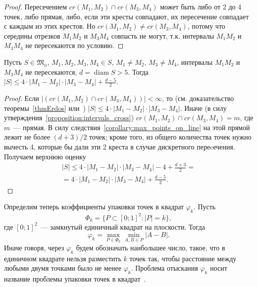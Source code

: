 \begin{proof}
	Пересечением $cr(M_1,M_2) \cap cr(M_3,M_4)$ может быть либо от 2 до 4 точек, либо прямая,
	либо, если эти кресты совпадают, их пересечение совпадает с каждым из этих крестов.
	Но $cr(M_1,M_2) \neq cr(M_3,M_4)$, потому что середины отрезков $M_1 M_2$ и $M_3 M_4$
	совпасть не могут, т.к. интервалы $M_1 M_2$ и $M_3 M_4$ не пересекаются по условию.
\end{proof}

\begin{lemma}
	\label{lemma_preliminary_size}
	Пусть $S\in\mathfrak{M}_n$,
	$M_1, M_2, M_3, M_4 \in S$,
	$M_1 \neq M_2$, $M_3 \neq M_4$,
	интервалы $M_1 M_2$ и $M_3 M_4$ не пересекаются,
	$d = \operatorname{diam} S > 5$.
	Тогда $|S| \leq 4 \cdot |M_1 - M_2| \cdot |M_3 - M_4| + \frac{d-5}{2}$.
\end{lemma}

\begin{proof}
	Если $|(cr(M_1, M_2) \cap cr(M_3, M_4))| < \infty$,
	то (см. доказательство теоремы~\ref{thmErdos} или~\cite[часть 2, неравенство (1)]{solymosi2003note})
	$|S| \leq 4 \cdot |M_1 - M_2| \cdot |M_3 - M_4|$.
	Иначе (в силу утверждения~\ref{proposition:intervals_cross}) $cr(M_1, M_2) \cap cr(M_3, M_4) = m$,
	где $m$~--- прямая.
	В силу следствия~\ref{corollary:max_points_on_line} на этой прямой лежит не более $(d+3)/2$ точек;
	кроме того, из общего количества точек нужно вычесть 4,
	которые бы дали эти 2 креста в случае дискретного переcечения.
	Получаем верхнюю оценку
	\begin{multline}
		|S| \leq 4 \cdot |M_1 - M_2| \cdot |M_3 - M_4| - 4 + \frac{d+3}{2}
		=
		\\=
		4 \cdot |M_1 - M_2| \cdot |M_3 - M_4| + \frac{d-5}{2}
		.
	\end{multline}
\end{proof}

Определим теперь коэффициенты упаковки точек в квадрат $\varphi_k$.
Пусть
\begin{equation*}
	\Phi_k = \{ P \subset [0;1]^2 : |P|=k\}
	,
\end{equation*}
где $[0;1]^2$~--- замкнутый единичный квадрат на плоскости.
Тогда
\begin{equation*}
	\varphi_k = \max_{P \in \Phi_k} \min_{A,B \in P} |A - B|
	.
\end{equation*}
Иначе говоря, через $\varphi_k$ будем обозначать наибольшее число, такое,
что в единичном квадрате нельзя разместить $k$ точек так,
чтобы расстояние между любыми двумя точками было не менее $\varphi_k$.
Проблема отыскания $\varphi_k$ носит название проблемы упаковки точек в квадрат~\cite{locatelli2002packing,costa2013valid}.

